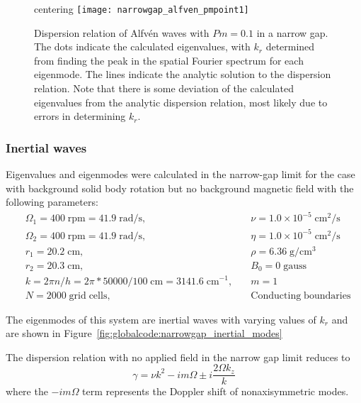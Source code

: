 \documentclass[letterpaper]{article}
\begin{document}
\begin{figure}
centering
\texttt{[image: narrowgap\_alfven\_pmpoint1]}
\caption[Dispersion relation of Alfv\'en waves with $Pm=0.1$ in a
  narrow gap]{Dispersion relation of Alfv\'en waves with $Pm=0.1$ in a
  narrow gap. The dots indicate the calculated eigenvalues, with $k_r$
  determined from finding the peak in the spatial Fourier spectrum for
  each eigenmode. The lines indicate the analytic solution to the
  dispersion relation. Note that there is some deviation of the
  calculated eigenvalues from the analytic dispersion relation, most
  likely due to errors in determining $k_r$.}
\label{fig:globalcode:narrowgap_alfven_pmpoint1}
\end{figure}


\subsubsection{Inertial waves}

Eigenvalues and eigenmodes were calculated in the narrow-gap limit for
the case with background solid body rotation but no background
magnetic field with the following parameters:
\begin{align*}
&\Omega_1 = 400\;\mathrm{rpm} = 41.9\;\mathrm{rad/s},\quad
    &\nu = 1.0\times10^{-5}\;\mathrm{cm^2/s}
\\
&\Omega_2 = 400\;\mathrm{rpm} = 41.9\;\mathrm{rad/s},\quad
    &\eta = 1.0\times10^{-5}\;\mathrm{cm^2/s}
\\
&r_1 = 20.2\;\mathrm{cm},\quad &\rho = 6.36\;\mathrm{g/cm^3}
\\
&r_2 = 20.3\;\mathrm{cm},\quad &B_0 = 0\; \mathrm{gauss}
\\
&k = 2\pi n/h = 2\pi*50000/100\;\mathrm{cm} = 3141.6\;\mathrm{cm^{-1}},\quad
    &m=1
\\
&N = 2000\;\mathrm{grid\;cells},\quad &\mathrm{Conducting\;boundaries}
\end{align*}

The eigenmodes of this system are inertial waves with varying values
of $k_r$ and are shown in
Figure~\ref{fig:globalcode:narrowgap_inertial_modes}

The dispersion relation with no applied field in the narrow gap limit
reduces to
\begin{equation}
\gamma = \nu k^2 - im\Omega \pm i \frac{2 \Omega k_z}{k}
\end{equation}
where the $-im\Omega$ term represents the Doppler shift of
nonaxisymmetric modes.
\end{document}
